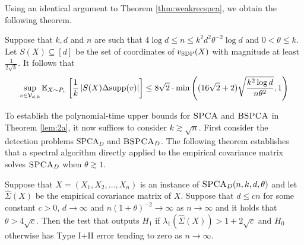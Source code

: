 Using an identical argument to Theorem \ref{thm:weakrecspca}, we obtain the following theorem.

\begin{theorem}
Suppose that $k, d$ and $n$ are such that $4 \log d \le n \le k^2 d^2 \theta^{-2} \log d$ and $0 < \theta \le k$. Let $S(X) \subseteq [d]$ be the set of coordinates of $v_{\textnormal{SDP}}(X)$ with magnitude at least $\frac{1}{2\sqrt{k}}$. It follows that
$$\sup_{v \in \mathcal{V}_{d, k}} \mathbb{E}_{X \sim P_v} \left[\frac{1}{k} \left|S(X) \Delta \textnormal{supp}(v)\right| \right] \le 8\sqrt{2} \cdot \min\left( (16\sqrt{2} + 2) \sqrt{\frac{k^2 \log d}{n \theta^2}}, 1 \right)$$
\end{theorem}

To establish the polynomial-time upper bounds for $\textsc{SPCA}$ and $\textsc{BSPCA}$ in Theorem \ref{lem:2a}, it now suffices to consider $k \gtrsim \sqrt{n}$. First consider the detection problems $\text{SPCA}_D$ and $\textsc{BSPCA}_D$. The following theorem establishes that a spectral algorithm directly applied to the empirical covariance matrix solves $\textsc{SPCA}_D$ when $\theta \gtrsim 1$.

\begin{theorem} \label{thm:spectralspca}
Suppose that $X = (X_1, X_2, \dots, X_n)$ is an instance of $\textsc{SPCA}_D(n, k, d, \theta)$ and let $\hat{\Sigma}(X)$ be the empirical covariance matrix of $X$. Suppose that $d \le cn$ for some constant $c > 0$, $d \to \infty$ and $n(1 + \theta)^{-2} \to \infty$ as $n \to \infty$ and it holds that $\theta > 4\sqrt{c}$. Then the test that outputs $H_1$ if $\lambda_1(\hat{\Sigma}(X)) > 1 + 2\sqrt{c}$ and $H_0$ otherwise has Type I$+$II error tending to zero as $n \to \infty$.
\end{theorem}


